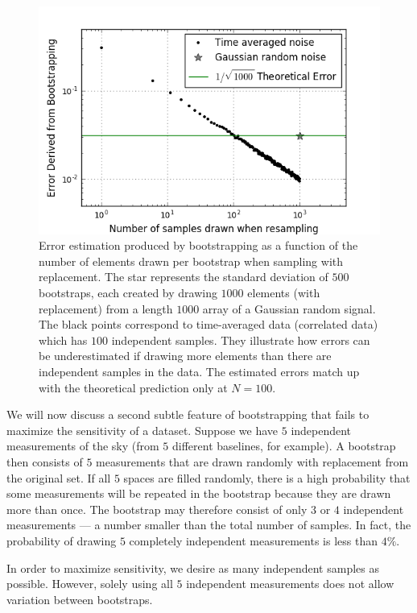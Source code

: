\documentclass[preprint2,numberedappendix,tighten]{aastex6}  %
\begin{document}
\begin{figure}
	\centering
	\includegraphics[trim={0.3cm 0.3cm 0.3cm 0.3cm},width=\columnwidth]{plots/toy_error1.png}
	\caption{Error estimation produced by bootstrapping as a function of the number of elements drawn per bootstrap when sampling with replacement. The star represents the standard deviation of $500$ bootstraps, each created by drawing $1000$ elements (with replacement) from a length $1000$ array of a Gaussian random signal. The black points correspond to time-averaged data (correlated data) which has $100$ independent samples. They illustrate how errors can be underestimated if drawing more elements than there are independent samples in the data. The estimated errors match up with the theoretical prediction only at $N=100$.}
	\label{fig:toy_error1}
\end{figure}

We will now discuss a second subtle feature of bootstrapping that fails to maximize the sensitivity of a dataset. Suppose we have $5$ independent measurements of the sky (from $5$ different baselines, for example). A bootstrap then consists of $5$ measurements that are drawn randomly with replacement from the original set. If all $5$ spaces are filled randomly, there is a high probability that some measurements will be repeated in the bootstrap because they are drawn more than once. The bootstrap may therefore consist of only $3$ or $4$ independent measurements --- a number smaller than the total number of samples. In fact, the probability of drawing $5$ completely independent measurements is less than $4\%$.

In order to maximize sensitivity, we desire as many independent samples as possible. However, solely using all $5$ independent measurements does not allow variation between bootstraps. 
\end{document}
